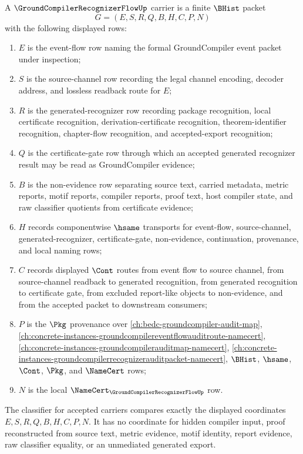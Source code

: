 \begin{definition}
\label{def:groundcompiler-recognizer-flow-carrier}
A $\GroundCompilerRecognizerFlowUp$ carrier is a finite $\BHist$ packet
$$
G=(E,S,R,Q,B,H,C,P,N)
$$
with the following displayed rows:
\begin{enumerate}
\item $E$ is the event-flow row naming the formal GroundCompiler event packet under inspection;
\item $S$ is the source-channel row recording the legal channel encoding, decoder address, and lossless readback route for $E$;
\item $R$ is the generated-recognizer row recording package recognition, local certificate recognition, derivation-certificate recognition, theorem-identifier recognition, chapter-flow recognition, and accepted-export recognition;
\item $Q$ is the certificate-gate row through which an accepted generated recognizer result may be read as GroundCompiler evidence;
\item $B$ is the non-evidence row separating source text, carried metadata, metric reports, motif reports, compiler reports, proof text, host compiler state, and raw classifier quotients from certificate evidence;
\item $H$ records componentwise $\hsame$ transports for event-flow, source-channel, generated-recognizer, certificate-gate, non-evidence, continuation, provenance, and local naming rows;
\item $C$ records displayed $\Cont$ routes from event flow to source channel, from source-channel readback to generated recognition, from generated recognition to certificate gate, from excluded report-like objects to non-evidence, and from the accepted packet to downstream consumers;
\item $P$ is the $\Pkg$ provenance over \autoref{ch:bedc-groundcompiler-audit-map}, \autoref{ch:concrete-instances-groundcompilereventflowauditroute-namecert}, \autoref{ch:concrete-instances-groundcompilerauditmap-namecert}, \autoref{ch:concrete-instances-groundcompilerrecognizerauditpacket-namecert}, $\BHist$, $\hsame$, $\Cont$, $\Pkg$, and $\NameCert$ rows;
\item $N$ is the local $\NameCert_{\GroundCompilerRecognizerFlowUp}$ row.
\end{enumerate}
The classifier for accepted carriers compares exactly the displayed coordinates $E,S,R,Q,B,H,C,P,N$. It has no coordinate for hidden compiler input, proof reconstructed from source text, metric evidence, motif identity, report evidence, raw classifier equality, or an unmediated generated export.
\end{definition}

